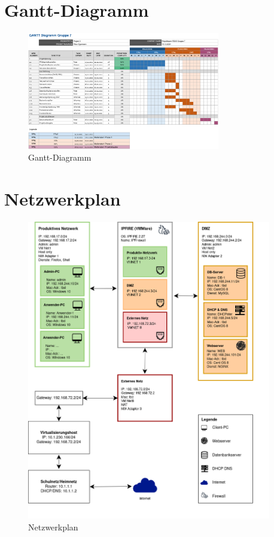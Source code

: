 \documentclass[a4paper,
    11pt,
    headings=small,
    ngerman,
    listof=totoc,
    numbers=noenddot]{scrreprt}[2021/11/13]
\begin{document}
\appendix
{}


\chapter{Gantt-Diagramm}

\begin{figure}[h!]
  \centering
  \includegraphics[angle=90,origin=c,width=0.75\textwidth]{data/Gantt.png}
  \caption{Gantt-Diagramm}
  \label{fig:Gantt}
\end{figure}


\chapter{Netzwerkplan}

\begin{figure}[h!]
  \centering
  \includegraphics[width=0.95\textwidth]{data/Netzwerkplan.png}
  \caption{Netzwerkplan}
  \label{fig:Netzwerkplan}
\end{figure}
\end{document}
